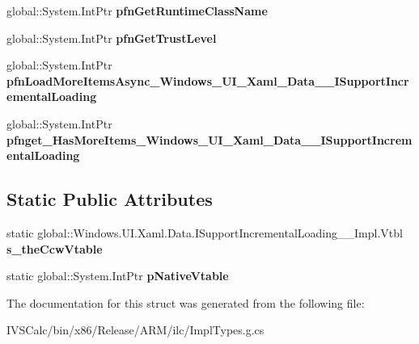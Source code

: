 \begin{DoxyCompactItemize}
global\+::\+System.\+Int\+Ptr {\bfseries pfn\+Get\+Runtime\+Class\+Name}
\item 
\mbox{\label{struct_windows_1_1_u_i_1_1_xaml_1_1_data_1_1_i_support_incremental_loading_____impl_1_1_vtbl_a96b1701d3b47c9d468dd241fc77887c4}} 
global\+::\+System.\+Int\+Ptr {\bfseries pfn\+Get\+Trust\+Level}
\item 
\mbox{\label{struct_windows_1_1_u_i_1_1_xaml_1_1_data_1_1_i_support_incremental_loading_____impl_1_1_vtbl_a6f00416afb863f116ba5782dbf89f4d4}} 
global\+::\+System.\+Int\+Ptr {\bfseries pfn\+Load\+More\+Items\+Async\+\_\+\+Windows\+\_\+\+U\+I\+\_\+\+Xaml\+\_\+\+Data\+\_\+\+\_\+\+I\+Support\+Incremental\+Loading}
\item 
\mbox{\label{struct_windows_1_1_u_i_1_1_xaml_1_1_data_1_1_i_support_incremental_loading_____impl_1_1_vtbl_a5413550e7712856f9d8ddfe605a00be8}} 
global\+::\+System.\+Int\+Ptr {\bfseries pfnget\+\_\+\+Has\+More\+Items\+\_\+\+Windows\+\_\+\+U\+I\+\_\+\+Xaml\+\_\+\+Data\+\_\+\+\_\+\+I\+Support\+Incremental\+Loading}
\end{DoxyCompactItemize}
\subsection*{Static Public Attributes}
\begin{DoxyCompactItemize}
\item 
\mbox{\label{struct_windows_1_1_u_i_1_1_xaml_1_1_data_1_1_i_support_incremental_loading_____impl_1_1_vtbl_ac60fcb84474cad57657c47aaf07d2dcc}} 
static global\+::\+Windows.\+U\+I.\+Xaml.\+Data.\+I\+Support\+Incremental\+Loading\+\_\+\+\_\+\+Impl.\+Vtbl {\bfseries s\+\_\+the\+Ccw\+Vtable}
\item 
\mbox{\label{struct_windows_1_1_u_i_1_1_xaml_1_1_data_1_1_i_support_incremental_loading_____impl_1_1_vtbl_a0d1fb3b9caa4acce35ba8eef61f1ddc6}} 
static global\+::\+System.\+Int\+Ptr {\bfseries p\+Native\+Vtable}
\end{DoxyCompactItemize}


The documentation for this struct was generated from the following file\+:\begin{DoxyCompactItemize}
\item 
I\+V\+S\+Calc/bin/x86/\+Release/\+A\+R\+M/ilc/Impl\+Types.\+g.\+cs\end{DoxyCompactItemize}
